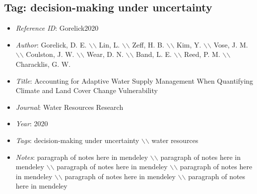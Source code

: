 \documentclass[11pt]{article}
\begin{document}
\subsection{Tag: decision-making under uncertainty} 
\noindent\citep{Gorelick2020} 
\begin{itemize} 
\item{\textit{Reference ID}:  Gorelick2020} 

\item{\textit{Author}:  Gorelick, D. E. $\backslash$$\backslash$ Lin, L. $\backslash$$\backslash$ Zeff, H. B. $\backslash$$\backslash$ Kim, Y. $\backslash$$\backslash$ Vose, J. M. $\backslash$$\backslash$ Coulston, J. W. $\backslash$$\backslash$ Wear, D. N. $\backslash$$\backslash$ Band, L. E. $\backslash$$\backslash$ Reed, P. M. $\backslash$$\backslash$ Characklis, G. W.} 

\item{\textit{Title}:  Accounting for Adaptive Water Supply Management When Quantifying Climate and Land Cover Change Vulnerability} 

\item{\textit{Journal}:  Water Resources Research} 

\item{\textit{Year}:  2020} 

\item{\textit{Tags}:  decision-making under uncertainty $\backslash$$\backslash$ water resources} 

\item{\textit{Notes}:  paragraph of notes here in mendeley $\backslash$$\backslash$ paragraph of notes here in mendeley $\backslash$$\backslash$ paragraph of notes here in mendeley $\backslash$$\backslash$ paragraph of notes here in mendeley $\backslash$$\backslash$ paragraph of notes here in mendeley $\backslash$$\backslash$ paragraph of notes here in mendeley} 

\end{itemize}\medskip
\end{document}
